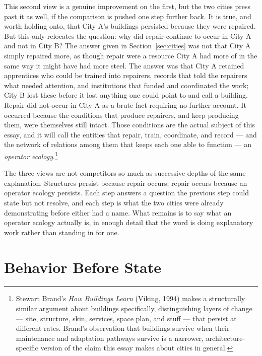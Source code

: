 \documentclass[11pt]{article}
\begin{document}
This second view is a genuine improvement on the first, but the two
cities press past it as well, if the comparison is pushed one step
further back. It is true, and worth holding onto, that City A's
buildings persisted because they were repaired. But this only
relocates the question: why did repair continue to occur in City A
and not in City B? The answer given in Section~\ref{sec:cities} was
not that City A simply repaired more, as though repair were a
resource City A had more of in the same way it might have had more
steel. The answer was that City A retained apprentices who could be
trained into repairers, records that told the repairers what needed
attention, and institutions that funded and coordinated the work; City
B lost these before it lost anything one could point to and call a
building. Repair did not occur in City A as a brute fact requiring no
further account. It occurred because the conditions that produce
repairers, and keep producing them, were themselves still intact.
Those conditions are the actual subject of this essay, and it will
call the entities that repair, train, coordinate, and record --- and
the network of relations among them that keeps each one able to
function --- an \emph{operator ecology}.\footnote{Stewart Brand's
\emph{How Buildings Learn} (Viking, 1994) makes a structurally
similar argument about buildings specifically, distinguishing layers
of change --- site, structure, skin, services, space plan, and stuff
--- that persist at different rates. Brand's observation that
buildings survive when their maintenance and adaptation pathways
survive is a narrower, architecture-specific version of the claim
this essay makes about cities in general.}

The three views are not competitors so much as successive depths of
the same explanation. Structures persist because repair occurs;
repair occurs because an operator ecology persists. Each step answers
a question the previous step could state but not resolve, and each
step is what the two cities were already demonstrating before either
had a name. What remains is to say what an operator ecology actually
is, in enough detail that the word is doing explanatory work rather
than standing in for one.

\section{Behavior Before State}\label{sec:behavior}
\end{document}
